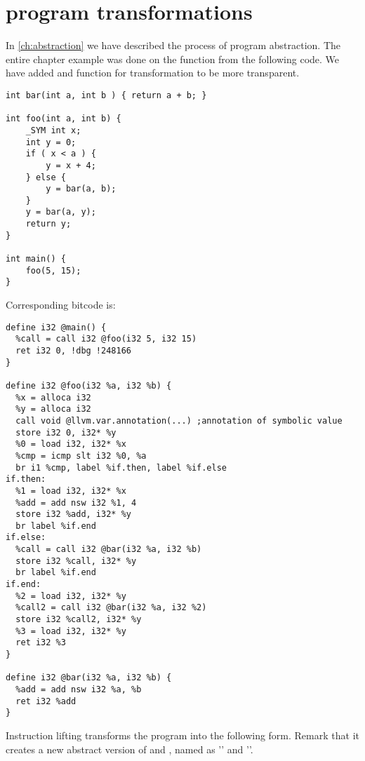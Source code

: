 \areaset[current]{\dimexpr\textwidth+\marginparwidth+\marginparsep}{\textheight}
\setlength{\marginparwidth}{0pt}
\setlength{\marginparsep}{0pt}


\chapter{\LLVM program transformations}\label{ch:appendixa}
In \autoref{ch:abstraction} we have described the process of program abstraction.
The entire chapter example was done on the  function from the following code. We
have added  and  function for transformation to be more transparent.

\begin{verbatim}
int bar(int a, int b ) { return a + b; }

int foo(int a, int b) {
    _SYM int x;
    int y = 0;
    if ( x < a ) {
        y = x + 4;
    } else {
        y = bar(a, b);
    }
    y = bar(a, y);
    return y;
}

int main() {
    foo(5, 15);
}
\end{verbatim}

\noindent
Corresponding \LLVM bitcode is:

\begin{verbatim}
define i32 @main() {
  %call = call i32 @foo(i32 5, i32 15)
  ret i32 0, !dbg !248166
}

define i32 @foo(i32 %a, i32 %b) {
  %x = alloca i32
  %y = alloca i32
  call void @llvm.var.annotation(...) ;annotation of symbolic value
  store i32 0, i32* %y
  %0 = load i32, i32* %x
  %cmp = icmp slt i32 %0, %a
  br i1 %cmp, label %if.then, label %if.else
if.then:
  %1 = load i32, i32* %x
  %add = add nsw i32 %1, 4
  store i32 %add, i32* %y
  br label %if.end
if.else:
  %call = call i32 @bar(i32 %a, i32 %b)
  store i32 %call, i32* %y
  br label %if.end
if.end:
  %2 = load i32, i32* %y
  %call2 = call i32 @bar(i32 %a, i32 %2)
  store i32 %call2, i32* %y
  %3 = load i32, i32* %y
  ret i32 %3
}

define i32 @bar(i32 %a, i32 %b) {
  %add = add nsw i32 %a, %b
  ret i32 %add
}
\end{verbatim}

\noindent
Instruction lifting transforms the program into the following form. Remark that
it creates a new abstract version of  and , named as
'' and ''.\newpage

